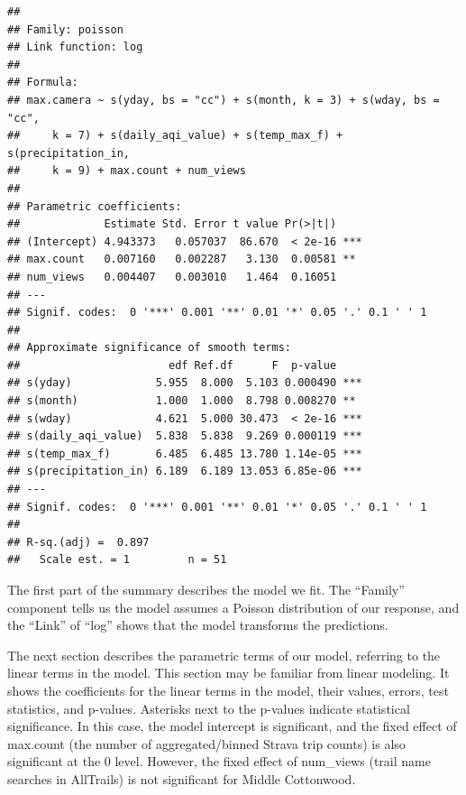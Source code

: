 \documentclass[
]{book}
\newenvironment{Shaded}{\begin{snugshade}}{\end{snugshade}}
\newcommand{\CommentTok}[1]{\textcolor[rgb]{0.56,0.35,0.01}{\textit{#1}}}
\begin{document}
\begin{verbatim}
## 
## Family: poisson 
## Link function: log 
## 
## Formula:
## max.camera ~ s(yday, bs = "cc") + s(month, k = 3) + s(wday, bs = "cc", 
##     k = 7) + s(daily_aqi_value) + s(temp_max_f) + s(precipitation_in, 
##     k = 9) + max.count + num_views
## 
## Parametric coefficients:
##             Estimate Std. Error t value Pr(>|t|)    
## (Intercept) 4.943373   0.057037  86.670  < 2e-16 ***
## max.count   0.007160   0.002287   3.130  0.00581 ** 
## num_views   0.004407   0.003010   1.464  0.16051    
## ---
## Signif. codes:  0 '***' 0.001 '**' 0.01 '*' 0.05 '.' 0.1 ' ' 1
## 
## Approximate significance of smooth terms:
##                       edf Ref.df      F  p-value    
## s(yday)             5.955  8.000  5.103 0.000490 ***
## s(month)            1.000  1.000  8.798 0.008270 ** 
## s(wday)             4.621  5.000 30.473  < 2e-16 ***
## s(daily_aqi_value)  5.838  5.838  9.269 0.000119 ***
## s(temp_max_f)       6.485  6.485 13.780 1.14e-05 ***
## s(precipitation_in) 6.189  6.189 13.053 6.85e-06 ***
## ---
## Signif. codes:  0 '***' 0.001 '**' 0.01 '*' 0.05 '.' 0.1 ' ' 1
## 
## R-sq.(adj) =  0.897   
##   Scale est. = 1         n = 51
\end{verbatim}

\begin{Shaded}
\end{Shaded}

The first part of the summary describes the model we fit. The ``Family'' component tells us the model assumes a Poisson distribution of our response, and the ``Link'' of ``log'' shows that the model transforms the predictions.

The next section describes the parametric terms of our model, referring to the linear terms in the model. This section may be familiar from linear modeling. It shows the coefficients for the linear terms in the model, their values, errors, test statistics, and p-values. Asterisks next to the p-values indicate statistical significance. In this case, the model intercept is significant, and the fixed effect of max.count (the number of aggregated/binned Strava trip counts) is also significant at the 0 level. However, the fixed effect of num\_views (trail name searches in AllTrails) is not significant for Middle Cottonwood.
\end{document}
